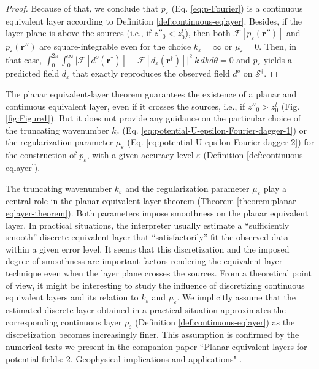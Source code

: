 \begin{proof}
	Because of that, we conclude that $p_{\varepsilon}$ (Eq. \ref{eq:p-Fourier})
	is a continuous equivalent layer according to Definition \ref{def:continuous-eqlayer}. 
	Besides, if the layer plane is above the sources (i.e., if $z''_{0} < z^{t}_{0}$), then both 
	$\mathcal{F} [ p_{\varepsilon}(\mathbf{r}'') ]$ and $p_{\varepsilon}(\mathbf{r}'')$ are square-integrable
	even for the choice $k_{\varepsilon} = \infty$ or $\mu_{\varepsilon} = 0$. Then, in that case, 
	$\int_{0}^{2\pi} \int_{0}^{\infty} 
	\vert \mathcal{F} [ d^{o}(\mathbf{r}^{\dagger}) ] - \mathcal{F} [d_{\varepsilon}(\mathbf{r}^{\dagger}) ] \vert^{2} \: k \, dkd\theta 
	= 0$ and $p_{\varepsilon}$ yields a predicted field $d_{\varepsilon}$ that exactly reproduces the observed field $d^{o}$ 
	on $\mathcal{S}^{\dagger}$.
\end{proof}
	
\begin{remark}
	\label{rm:remark1}
	The planar equivalent-layer theorem guarantees the existence of a planar and continuous equivalent layer, even if
	it crosses the sources, i.e., if $z''_{0} > z^{t}_{0}$ (Fig. \ref{fig:Figure1}).
	But it does not provide any guidance on the particular choice of the 
	truncating wavenumber $k_{\varepsilon}$ (Eq. \ref{eq:potential-U-epsilon-Fourier-dagger-1}) or the 
	regularization parameter $\mu_{\varepsilon}$ (Eq. \ref{eq:potential-U-epsilon-Fourier-dagger-2}) 
	for the construction of $p_{\varepsilon}$, with a given accuracy level 
	$\varepsilon$ (Definition \ref{def:continuous-eqlayer}).
\end{remark}

\begin{remark}
	\label{rm:remark2}
	The truncating wavenumber $k_{\varepsilon}$ and the regularization parameter $\mu_{\varepsilon}$ 
	play a central role in the planar equivalent-layer theorem (Theorem \ref{theorem:planar-eqlayer-theorem}). 
	Both parameters impose smoothness on the planar equivalent layer. 
	In practical situations, the interpreter usually estimate a ``sufficiently smooth'' discrete equivalent layer 
	that ``satisfactorily'' fit the observed data within a given error level. 
	It seems that this discretization and the imposed degree of smoothness are important factors rendering 
	the equivalent-layer technique even when the layer plane crosses the sources.
	From a theoretical point of view, it might be interesting to study the influence of
	discretizing continuous equivalent layers and its relation to $k_{\varepsilon}$ and $\mu_{\varepsilon}$. 
	We implicitly assume that the estimated discrete layer obtained in a practical situation 
	approximates the corresponding continuous layer $p_{\varepsilon}$ (Definition \ref{def:continuous-eqlayer}) as the discretization becomes increasingly finer. 
	This assumption is confirmed by the numerical tests we present in the companion paper 
	``Planar equivalent layers for potential fields: 2. Geophysical implications and applications" .
\end{remark}

